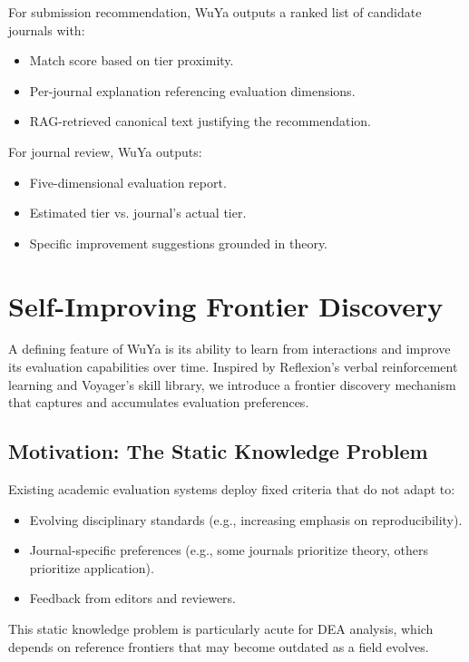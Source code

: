 \documentclass[11pt,a4paper]{article}
\newcommand{\dea}{DEA}
\begin{document}
For submission recommendation, WuYa outputs a ranked list of candidate journals with:
\begin{itemize}
    \item Match score based on tier proximity.
    \item Per-journal explanation referencing evaluation dimensions.
    \item RAG-retrieved canonical text justifying the recommendation.
\end{itemize}

For journal review, WuYa outputs:
\begin{itemize}
    \item Five-dimensional evaluation report.
    \item Estimated tier vs. journal's actual tier.
    \item Specific improvement suggestions grounded in theory.
\end{itemize}

\section{Self-Improving Frontier Discovery}
\label{sec:frontier}

A defining feature of WuYa is its ability to learn from interactions and improve its evaluation capabilities over time. Inspired by Reflexion's verbal reinforcement learning and Voyager's skill library, we introduce a frontier discovery mechanism that captures and accumulates evaluation preferences.

\subsection{Motivation: The Static Knowledge Problem}

Existing academic evaluation systems deploy fixed criteria that do not adapt to:
\begin{itemize}
    \item Evolving disciplinary standards (e.g., increasing emphasis on reproducibility).
    \item Journal-specific preferences (e.g., some journals prioritize theory, others prioritize application).
    \item Feedback from editors and reviewers.
\end{itemize}

This static knowledge problem is particularly acute for \dea{} analysis, which depends on reference frontiers that may become outdated as a field evolves.
\end{document}
